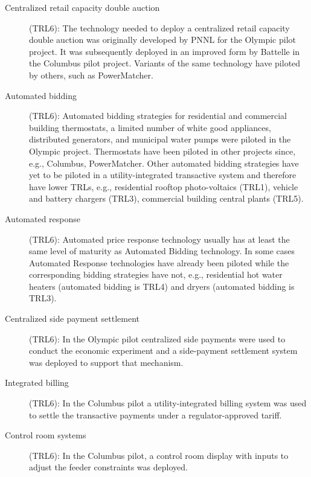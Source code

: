\documentclass[10pt,twocolumn]{article}
\begin{document}
\begin{description}

    \item[Centralized retail capacity double auction] (TRL6): The technology needed to deploy a centralized retail capacity double auction was originally developed by PNNL for the Olympic pilot project. It was subsequently deployed in an improved form by Battelle in the Columbus pilot project. Variants of the same technology have piloted by others, such as PowerMatcher.
    
    \item[Automated bidding] (TRL6): Automated bidding strategies for residential and commercial building thermostats, a limited number of white good appliances, distributed generators, and municipal water pumps were piloted in the Olympic project.  Thermostats have been piloted in other projects since, e.g., Columbus, PowerMatcher.  Other automated bidding strategies have yet to be piloted in a utility-integrated transactive system and therefore have lower TRLs, e.g., residential rooftop photo-voltaics (TRL1), vehicle and battery chargers (TRL3), commercial building central plants (TRL5). 
    
    \item[Automated response] (TRL6): Automated price response technology usually has at least the same level of maturity as Automated Bidding technology. In some cases Automated Response technologies have already been piloted while the corresponding bidding strategies have not, e.g., residential hot water heaters (automated bidding is TRL4) and dryers (automated bidding is TRL3).
    
    \item[Centralized side payment settlement] (TRL6): In the Olympic pilot centralized side payments were used to conduct the economic experiment and a side-payment settlement system was deployed to support that mechanism.
    
    \item[Integrated billing] (TRL6): In the Columbus pilot a utility-integrated billing system was used to settle the transactive payments under a regulator-approved tariff.
    
    \item[Control room systems] (TRL6): In the Columbus pilot, a control room display with inputs to adjust the feeder constraints was deployed.
    
\end{description}
\end{document}
